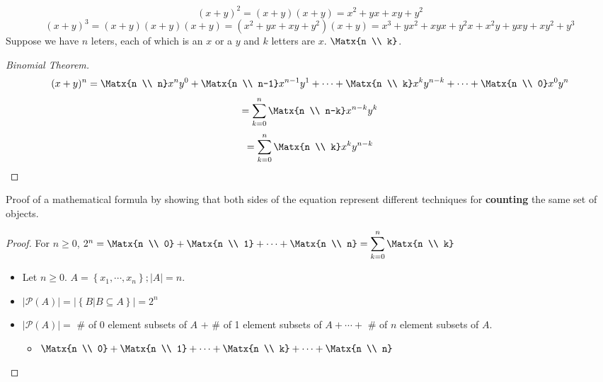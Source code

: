\newpage
{}
\begin{example}
\[ (x+y)^2 = (x+y)(x+y) = x^2+yx+xy+y^2 \]
\[ (x+y)^3 = (x+y)(x+y)(x+y) = (x^2+yx+xy+y^2) (x+y) = x^3+yx^2+xyx +y^2x + x^2y +yxy + xy^2 + y^3 \]
Suppose we have $n$ leters, each of which is an $x$ or a $y$ and $k$ letters are $x$. $\Matx{n \\ k}$.
\end{example}
\begin{proof}[Binomial Theorem]
\[ (x+y)^n = \Matx{n \\ n}x^ny^0 + \Matx{n \\ n-1}x^{n-1}y^1 + \cdots + \Matx{n \\ k}x^ky^{n-k} + \cdots + \Matx{n \\ 0}x^0y^n \] 
\[ = \sum_{k=0}^n \Matx{n \\ n-k}x^{n-k}y^k \]
\[ = \sum_{k=0}^n \Matx{n \\ k}x^ky^{n-k}\]
\end{proof}
\begin{proposition}
Proof of a mathematical formula by showing that both sides of the equation represent different techniques for \textbf{counting} the same set of objects.
\end{proposition}
\begin{proof}
For $n \ge 0$, $2^n = \Matx{n \\ 0}+\Matx{n \\ 1} + \cdots + \Matx{n \\ n} = \displaystyle\sum_{k=0}^n \Matx{n \\ k}$
\begin{itemize}
\item Let $n\ge0$. $A = \left\{x_1,\cdots,x_n\right\}; |A| = n$.
\item $|\mathcal{P}(A)| = |\left\{ B|B\subseteq A\right\}| = 2^n $
\item $|\mathcal{P}(A)| = $ \# of 0 element subsets of $A$ $+$ \# of 1 element subsets of $A + \cdots +$ \# of $n$ element subsets of $A$.
    \begin{itemize}
        \item $\Matx{n \\ 0} + \Matx{n \\ 1} + \cdots + \Matx{n \\ k} + \cdots + \Matx{n \\ n}$
    \end{itemize}
\end{itemize}
\end{proof}

